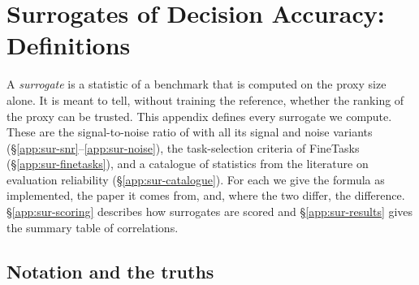 
\section{Surrogates of Decision Accuracy: Definitions}
\label{app:surrogates}

A \emph{surrogate} is a statistic of a benchmark that is computed on the proxy size alone. It is meant to tell, without training the reference, whether the ranking of the proxy can be trusted.
This appendix defines every surrogate we compute. These are the signal-to-noise ratio of \citet{heineman_signal_2025} with all its signal and noise variants (\S\ref{app:sur-snr}--\ref{app:sur-noise}), the task-selection criteria of FineTasks (\S\ref{app:sur-finetasks}), and a catalogue of statistics from the literature on evaluation reliability (\S\ref{app:sur-catalogue}).
For each we give the formula as implemented, the paper it comes from, and, where the two differ, the difference.
\S\ref{app:sur-scoring} describes how surrogates are scored and \S\ref{app:sur-results} gives the summary table of correlations.

\subsection{Notation and the truths}
\label{app:sur-notation}

